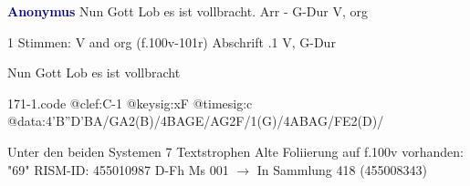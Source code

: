\documentclass[twocolumn]{book}
\begin{document}
\newline \par \vspace{7pt} \textcolor{darkblue}{\textbf{Anonymus  }}
\newline Nun Gott Lob es ist vollbracht. Arr - G-Dur
\newline V, org
\newline \begin{itshape}\end{itshape} 
\newline \textcolor{darkblue}{}  1 Stimmen: V and org  (f.100v-101r)
\newline Abschrift
.1  V, G-Dur
\newline \begin{footnotesize} Nun Gott Lob es ist vollbracht \end{footnotesize}  
\begin{filecontents*}{171-1.code}
@clef:C-1
@keysig:xF
@timesig:c
@data:4'B''D'BA/GA2(B)/4BAGE/AG2F/1(G)/4ABAG/FE2(D)/
\end{filecontents*}
\newline
%
\newline Unter den beiden Systemen 7 Textstrophen
\newline Alte Foliierung auf f.100v vorhanden: "69"
\newline RISM-ID: 455010987
\newline D-Fh  Ms 001
\newline $\rightarrow$ In Sammlung 418 (455008343)
      
\end{document}
